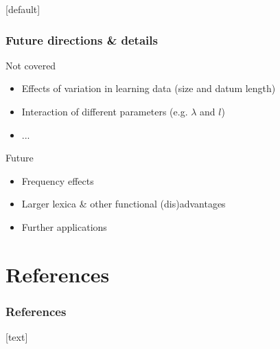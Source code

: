 \documentclass{beamer} %
\makeatletter
\newenvironment{withoutheadline}{
        \setbeamertemplate{headline}[default]
        \def\beamer@entrycode{\vspace*{-\headheight}}
    }{}
\makeatother
\begin{document}
\begin{withoutheadline}
\begin{frame}
  \frametitle{Future directions \& details}
Not covered
\begin{itemize}\itemsep0.75em
    \item Effects of variation in learning data (size and datum length)
    \item Interaction of different parameters (e.g. $\lambda$ and $l$)
    \item ...
\end{itemize}
\vspace{1cm}
Future
    \begin{itemize}\itemsep0.75em
      \item Frequency effects
      \item Larger lexica \& other functional (dis)advantages 
      \item Further applications
    \end{itemize}
\end{frame}
\section[References]{References}
\begin{frame}[allowframebreaks]\frametitle{References}
\tiny
{}[text]

\end{frame}
\end{withoutheadline}
\end{document}
